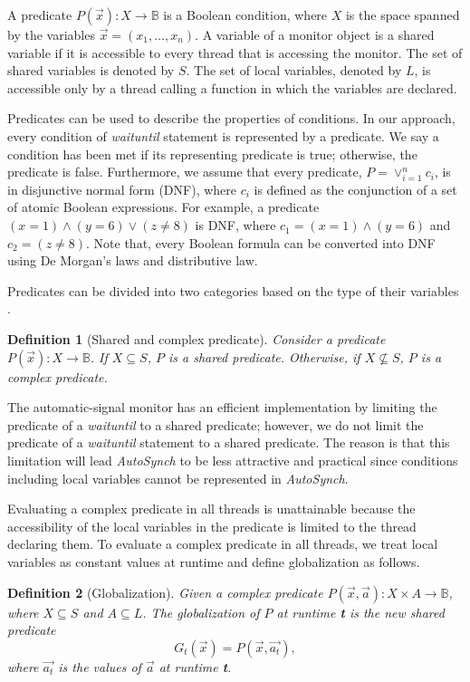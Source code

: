 \documentclass[preprint]{sigplanconf}
\newtheorem{definition}{Definition}
\begin{document}
A predicate $P(\vec{x}): X \rightarrow \mathbb{B}$ is a Boolean condition, 
where $X$ is the space spanned by the variables $\vec{x}=(x_1, \dots, x_n)$. 
A variable of a monitor object is a shared variable if it is accessible to every 
thread that is accessing the monitor. The set of shared variables is denoted by 
$S$. The set of local variables, denoted by $L$, is 
accessible only by a thread calling a function in which the variables are declared. 

Predicates can be used to describe the properties of conditions. In our
approach,
every condition of {\em waituntil} statement is represented by a predicate. We say
a condition has been met if its representing predicate is true; otherwise, the
predicate is false. 
Furthermore, we assume that every predicate, $P = \vee_{i=1}^nc_i$, is in 
disjunctive normal form (DNF), where $c_i$ is defined as the conjunction of a 
set of atomic Boolean expressions. For example, a predicate $(x = 1) \wedge 
(y = 6) \vee (z \ne 8)$ is DNF, where $c_1 = (x = 1) \wedge (y = 6)$ and $c_2 = 
(z \ne 8)$. Note that, every Boolean formula can be converted into DNF using 
De Morgan's laws and distributive law. 

Predicates can be divided into two categories based on the type of their 
variables \cite{bh05}.
\begin{definition}[Shared and complex predicate]
    Consider a predicate $P(\vec{x}): X \rightarrow \mathbb{B}$. If $X 
    \subseteq S$, $P$ 
    is a shared predicate. Otherwise, if $X \not\subseteq S$, $P$ 
    is a complex predicate. 
\end{definition}

The automatic-signal monitor has an efficient implementation \cite{kes77} by 
limiting the predicate of a {\em waituntil} to a shared predicate; however, 
we do not limit the predicate of a {\em waituntil} statement to a shared
predicate. The reason is that this limitation will lead {\em AutoSynch} to be less
attractive and practical since conditions including local variables cannot be 
represented in {\em AutoSynch}.

Evaluating a complex predicate in all threads is unattainable 
because the accessibility of the local variables in the predicate is limited 
to the thread declaring them. To evaluate a complex predicate in all 
threads, we treat local variables as constant values at runtime and define 
globalization as follows. 
\begin{definition}[Globalization]
    Given a complex predicate $P(\vec{x}, \vec{a}): X \times A \rightarrow 
    \mathbb{B}$, where $X \subseteq S$ and $A \subseteq L$. The globalization 
    of $P$ at runtime {\textbf t} is the new shared predicate
    \[
    G_t(\vec{x}) = P(\vec{x}, \vec{a_t}),
    \]
    where $\vec{a_t}$ is the values of $\vec{a}$ at runtime {\textbf t}. 
\end{definition}
\end{document}
